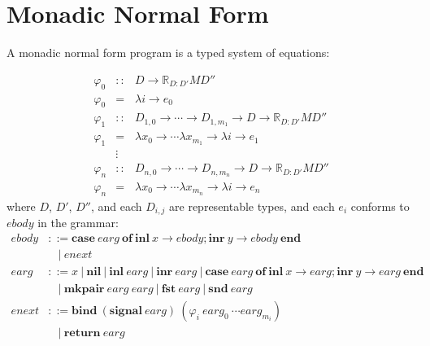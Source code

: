 \documentclass{article}[11pt]
\begin{document}
\section{Monadic Normal Form}
A monadic normal form program is a typed system of equations:

\begin{eqnarray*}
\varphi_0 &::& D \rightarrow \mathbb{R}_{D:D'} M D''\\
\varphi_0 &=& \lambda i \rightarrow e_0\\
\varphi_1 &::& D_{1,0} \rightarrow \cdots \rightarrow D_{1,m_1} \rightarrow D \rightarrow \mathbb{R}_{D:D'} M D''\\
\varphi_1 &=& \lambda x_0 \rightarrow \cdots \lambda x_{m_1} \rightarrow \lambda i \rightarrow e_1\\
          &\vdots&\\
\varphi_n &::& D_{n,0} \rightarrow \cdots \rightarrow D_{n,m_n} \rightarrow D \rightarrow \mathbb{R}_{D:D'} M D''\\
\varphi_n &=& \lambda x_0 \rightarrow \cdots \lambda x_{m_n} \rightarrow \lambda i \rightarrow e_n
\end{eqnarray*}
%
where $D$, $D'$, $D''$, and each $D_{i,j}$ are representable types, and each $e_i$ conforms to $\mathit{ebody}$ in the grammar:
%
$$
\begin{aligned}
\mathit{ebody} &::= \mathbf{case}~ \mathit{earg}~ \mathbf{of}~ \mathbf{inl}~ x \rightarrow \mathit{ebody} ; \mathbf{inr}~ y \rightarrow \mathit{ebody}~ \mathbf{end}\\
               &~~~~|~ \mathit{enext}\\
\mathit{earg}  &::= \mathit{x}~ |~ \mathbf{nil}~ |~ \mathbf{inl}~ \mathit{earg}~ |~ \mathbf{inr}~ \mathit{earg}~ |~ \mathbf{case}~ \mathit{earg}~ \mathbf{of}~ \mathbf{inl}~ x \rightarrow \mathit{earg} ; \mathbf{inr}~ y \rightarrow \mathit{earg}~ \mathbf{end}\\
               &~~~~|~ \mathbf{mkpair}~ \mathit{earg}~ \mathit{earg}~ |~ \mathbf{fst}~ \mathit{earg}~ |~ \mathbf{snd}~ \mathit{earg}\\
\mathit{enext} &::= \mathbf{bind}~ (\mathbf{signal}~ \mathit{earg})~ (\varphi_i~ \mathit{earg}_0~ \cdots \mathit{earg}_{m_i})\\
               &~~~~|~ \mathbf{return}~ \mathit{earg}
\end{aligned}
$$
\end{document}
